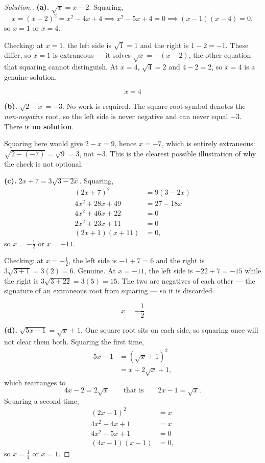\documentclass[11pt,a4paper]{article}
\theoremstyle{definition}
\newenvironment{solution}
  {\renewcommand{\qedsymbol}{}\begin{proof}[\textit{Solution}.]}
  {\end{proof}}
\begin{document}
\begin{solution}
\textbf{(a).} $\sqrt{x}=x-2$. Squaring,
$$x=(x-2)^{2}=x^{2}-4x+4 \implies x^{2}-5x+4=0 \implies (x-1)(x-4)=0,$$
so $x=1$ or $x=4$.

Checking: at $x=1$, the left side is $\sqrt{1}=1$ and the right is $1-2=-1$.
These differ, so $x=1$ is extraneous --- it solves $\sqrt{x}=-(x-2)$, the other
equation that squaring cannot distinguish. At $x=4$, $\sqrt{4}=2$ and $4-2=2$, so
$x=4$ is a genuine solution.

$$\boxed{x=4}$$

\textbf{(b).} $\sqrt{2-x}=-3$. No work is required. The square-root symbol denotes
the \emph{non-negative} root, so the left side is never negative and can never
equal $-3$. There is \textbf{no solution}.

Squaring here would give $2-x=9$, hence $x=-7$, which is entirely extraneous:
$\sqrt{2-(-7)}=\sqrt{9}=3$, not $-3$. This is the clearest possible illustration of
why the check is not optional.

\textbf{(c).} $2x+7=3\sqrt{3-2x}$. Squaring,
\begin{align*}
(2x+7)^{2}&=9(3-2x)\\
4x^{2}+28x+49&=27-18x\\
4x^{2}+46x+22&=0\\
2x^{2}+23x+11&=0\\
(2x+1)(x+11)&=0,
\end{align*}
so $x=-\frac{1}{2}$ or $x=-11$.

Checking: at $x=-\frac{1}{2}$, the left side is $-1+7=6$ and the right is
$3\sqrt{3+1}=3(2)=6$. Genuine. At $x=-11$, the left side is $-22+7=-15$ while the
right is $3\sqrt{3+22}=3(5)=15$. The two are negatives of each other --- the
signature of an extraneous root from squaring --- so it is discarded.

$$\boxed{x=-\frac{1}{2}}$$

\textbf{(d).} $\sqrt{5x-1}=\sqrt{x}+1$. One square root sits on each side, so
squaring once will not clear them both. Squaring the first time,
\begin{align*}
5x-1 & = \left(\sqrt{x}+1\right)^{2}\\
     & = x+2\sqrt{x}+1,
\end{align*}
which rearranges to
$$4x-2=2\sqrt{x} \qquad\text{that is}\qquad 2x-1=\sqrt{x} .$$
Squaring a second time,
\begin{align*}
(2x-1)^{2} & = x\\
4x^{2}-4x+1 & = x\\
4x^{2}-5x+1 & = 0\\
(4x-1)(x-1) & = 0,
\end{align*}
so $x=\frac{1}{4}$ or $x=1$.


\end{solution}
\end{document}
